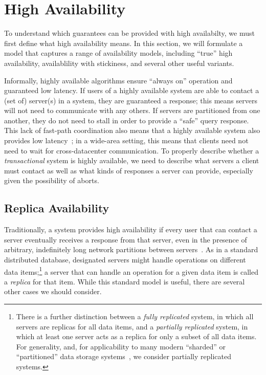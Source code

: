
\section{High Availability}
\label{sec:availability}

To understand which guarantees can be provided with high availabilty,
we must first define what high availability means. In this section, we
will formulate a model that captures a range of availability models,
including ``true'' high availability, availablility with stickiness,
and several other useful variants.

Informally, highly available algorithms ensure ``always on'' operation
and guaranteed low latency. If users of a highly available system are
able to contact a (set of) server(s) in a system, they are guaranteed
a response; this means servers will not need to communicate with any
others. If servers are partitioned from one another, they do not need
to stall in order to provide a ``safe'' query response. This lack of
fast-path coordination also means that a highly available system also
provides low latency~\cite{abadi-pacelc}; in a wide-area setting, this
means that clients need not need to wait for cross-datacenter
communication. To properly describe whether a \textit{transactional}
system is highly available, we need to describe what servers a client
must contact as well as what kinds of responses a server can provide,
especially given the possibility of aborts.

\subsection{Replica Availability}

Traditionally, a system provides high availability if every user that
can contact a server eventually receives a response from that server,
even in the presence of arbitrary, indefinitely long network
partitions between servers~\cite{gilbert-cap}. As in a standard
distributed database, designated servers might handle operations on
different data items;\footnote{There is a further distinction between
  a \textit{fully replicated} system, in which all servers are
  replicas for all data items, and a \textit{partially replicated}
  system, in which at least one server acts as a replica for only a
  subset of all data items. For generality, and, for applicability to
  many modern ``sharded'' or ``partitioned'' data storage
  systems~\cite{dynamo, pnuts, bigtable, spanner}, we consider partially
  replicated systems.} a server that can handle an operation for a
given data item is called a \textit{replica} for that item. While this
standard model is useful, there are several other cases we should
consider.

